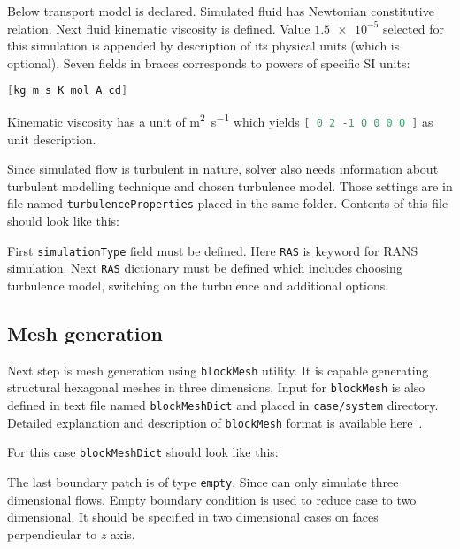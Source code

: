         Below transport model is declared. 
        Simulated fluid has Newtonian constitutive relation.
        Next fluid kinematic viscosity is defined.
        Value $\num{1.5e-5}$ selected for this simulation is appended by description of its physical units (which is optional).
        Seven fields in braces corresponds to powers of specific SI units:
        \begin{lstlisting}[language=C++]
            [kg m s K mol A cd]
        \end{lstlisting}
        Kinematic viscosity has a unit of \si{\meter\squared\per\second} which yields \lstinline[language=C++]{[ 0 2 -1 0 0 0 0 ]} as \oFoam unit description.

        Since simulated flow is turbulent in nature, solver also needs information about turbulent modelling technique and chosen turbulence model.
        Those settings are in file named \texttt{turbulenceProperties} placed in the same folder.
        Contents of this file should look like this:
        
        First \lstinline{simulationType} field must be defined. Here \lstinline{RAS} is \oFoam keyword for RANS simulation. 
        Next \lstinline{RAS} dictionary must be defined which includes choosing turbulence model, switching on the turbulence and additional options.

        \subsection{Mesh generation}
            Next step is mesh generation using \lstinline{blockMesh} utility. It is capable generating structural hexagonal meshes in three dimensions. 
            Input for \lstinline{blockMesh} is also defined in text file named \texttt{blockMeshDict} and placed in \texttt{case/system} directory. Detailed explanation and description of \lstinline{blockMesh} format is available here~\cite{blockMesh}.

            For this case \texttt{blockMeshDict} should look like this:
            

            The last boundary patch is of type \lstinline{empty}. Since \oFoam can only simulate three dimensional flows. Empty boundary condition is used to reduce case to two dimensional. It should be specified in two dimensional cases on faces perpendicular to $z$ axis.

